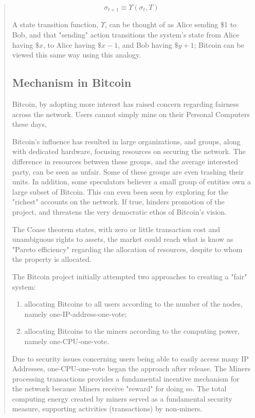\documentclass[12pt, titlepage, twocolumn]{report}
\begin{document}
\begin{quotation}
\begin{equation}
\sigma_{t+1} \equiv \Upsilon (\sigma_t,T)
\end{equation}

A state transition function, \(\Upsilon\), can be thought of as Alice sending \$1 to Bob, and that "sending" action transitions the system's state from Alice having \(\$x\), to Alice having \(\$x-1\), and Bob having \(\$y + 1\); Bitcoin can be viewed this same way using this analogy. 




\subsection{Mechanism in Bitcoin}
Bitcoin, by adopting more interest has raised concern regarding fairness across the network. Users cannot simply mine on their Personal Computers these days,

Bitcoin's influence has resulted in large organizations, and groups, along with dedicated hardware, focusing resources on securing the network. The difference in resources between these groups, and the average interested party, can be seen as unfair. Some of these groups are even trashing their units. In addition, some speculators believer a small group of entities own a large subset of Bitcoin. This can even been seen by exploring for the "richest" accounts on the network. If true, hinders promotion of the project, and threatens the very democratic ethos of Bitcoin's vision. 

The Coase theorem states, with zero or little transaction cost and unambiguous rights to assets, the market could reach what is know as "Pareto efficiency" regarding the allocation of resources, despite to whom the property is allocated. 

The Bitcoin project initially attempted two approaches to creating a "fair" system: 

\begin{enumerate}
	\item allocating Bitcoins to all users according to the number of the nodes, namely one-IP-address-one-vote; 
	\item allocating Bitcoins to the miners according to the computing power, namely one-CPU-one-vote.
\end{enumerate}
 
 
 Due to security issues concerning users being able to easily access many IP Addresses, one-CPU-one-vote began the approach after release. The Miners processing transactions provides a fundamental incentive mechanism for the network because Miners receive "reward" for doing so. The total computing energy created by miners served as a fundamental security measure, supporting activities (transactions) by non-miners.


\end{quotation}
\end{document}

